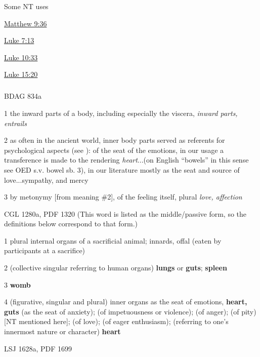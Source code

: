 				\begin{compactdesc}
					\item[Some NT uses] \textbf{}
						\begin{compactdesc}
							\item[{\hyperref[MATTHEW-9-36]{Matthew 9:36}}]
							\item[{\hyperref[LUKE-7-13]{Luke 7:13}}]
							\item[{\hyperref[LUKE-10-33]{Luke 10:33}}]
							\item[{\hyperref[LUKE-15-20]{Luke 15:20}}]
						\end{compactdesc}
				\end{compactdesc}
				
			\subparagraph{\texorpdfstring{\gr{σπλάγχνον}}{}}
				\label{SPLANCHNON}
			
				\begin{compactdesc}
					\item[BDAG 834a]
						\begin{compactitem}
							\item[1] the inward parts of a body, including especially the viscera, \textit{inward parts, entrails}
							\item[2] as often in the ancient world, inner body parts served as referents for psychological aspects (see ): of the seat of the emotions, in our usage a transference is made to the rendering \textit{heart}...(on English ``bowels'' in this sense see OED s.v. bowel sb. 3), in our literature mostly as the seat and source of love...sympathy, and mercy
							\item[3] by metonymy [from meaning \#2], of the feeling itself, plural \textit{love, affection}
						\end{compactitem}
					\item[CGL 1280a, PDF 1320] (This word is listed as the middle/passive form, so the definitions below correspond to that form.)
						\begin{compactitem}
							\item[1] plural internal organs of a sacrificial animal; innards, offal (eaten by participants at a sacrifice)
							\item[2] (collective singular referring to human organs) \textbf{lungs} or \textbf{guts}; \textbf{spleen}
							\item[3] \textbf{womb}
							\item[4] (figurative, singular and plural) inner organs as the seat of emotions, \textbf{heart, guts} (as the seat of anxiety); (of impetuousness or violence); (of anger); (of pity) [NT mentioned here]; (of love); (of eager enthusiasm); (referring to one's innermost nature or character) \textbf{heart}
						\end{compactitem}
					\item[LSJ 1628a, PDF 1699] \textbf{}
						\begin{compactitem}
							\item
						\end{compactitem}
				\end{compactdesc}
		

